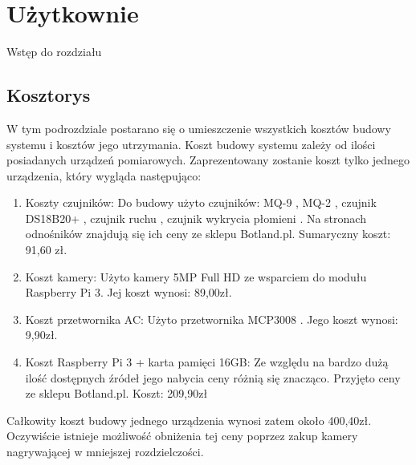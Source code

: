 \chapter{Użytkownie}

Wstęp do rozdziału

\section{Kosztorys}
W tym podrozdziale postarano się o umieszczenie wszystkich kosztów budowy systemu i kosztów jego utrzymania. Koszt budowy systemu zależy od ilości posiadanych urządzeń pomiarowych. Zaprezentowany zostanie koszt tylko jednego urządzenia, który wygląda następująco:
\begin{enumerate}
\item Koszty czujników:
Do budowy użyto czujników: MQ-9 \cite{specyfikacjaMQ-9}, MQ-2 \cite{specyfikacjaMQ-2}, czujnik DS18B20+ \cite{specyfikacjaTemp}, czujnik ruchu \cite{pir}, czujnik wykrycia płomieni \cite {specyfikacjaFlame}. Na stronach odnośników znajdują się ich ceny ze sklepu Botland.pl. Sumaryczny koszt: 91,60 zł.
\item Koszt kamery:
Użyto kamery 5MP Full HD ze wsparciem do modułu Raspberry Pi 3. Jej koszt wynosi: 89,00zł.
\item Koszt przetwornika AC:
Użyto przetwornika MCP3008 \cite{specyfikacjaAC}. Jego koszt wynosi: 9,90zł.
\item Koszt Raspberry Pi 3 + karta pamięci 16GB: 
Ze względu na bardzo dużą ilość dostępnych źródeł jego nabycia ceny różnią się znacząco. Przyjęto ceny ze sklepu Botland.pl. Koszt: 209,90zł
\end{enumerate}
Całkowity koszt budowy jednego urządzenia wynosi zatem około 400,40zł. Oczywiście istnieje możliwość obniżenia tej ceny poprzez zakup kamery nagrywającej w mniejszej rozdzielczości.

